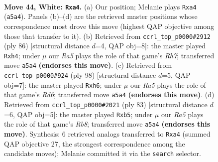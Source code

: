 \documentclass[11pt]{article}
\begin{document}
\clearpage

\begin{figure}[p]\centering
\begin{subfigure}{0.46\textwidth}\centering
\resizebox{\linewidth}{!}{%
\newchessgame
\chessboard[
  setfen={6k1/7r/8/R7/p7/P5K1/8/8 w - - 12 44},
  showmover=false,
  pgfstyle=straightmove, color=movearrow, markmove={a5-a4}
]}
\caption{}
\end{subfigure}\hfill
\begin{subfigure}{0.46\textwidth}\centering
\resizebox{\linewidth}{!}{%
\newchessgame
\chessboard[
  setfen={5r2/7R/8/3k4/7p/8/3K2P1/8 w - - 5 44},
  showmover=false,
  pgfstyle=straightmove, color=movearrow, markmove={h7-h4}
]}
\caption{}
\end{subfigure}
\\[4pt]
\begin{subfigure}{0.46\textwidth}\centering
\resizebox{\linewidth}{!}{%
\newchessgame
\chessboard[
  setfen={8/8/3R3p/5k1P/1K6/8/2r5/8 w - - 0 50},
  showmover=false,
  pgfstyle=straightmove, color=movearrow, markmove={d6-h6}
]}
\caption{}
\end{subfigure}\hfill
\begin{subfigure}{0.46\textwidth}\centering
\resizebox{\linewidth}{!}{%
\newchessgame
\chessboard[
  setfen={6k1/8/7p/1P6/8/3RK3/8/1r6 b - - 4 42},
  showmover=false,
  pgfstyle=straightmove, color=movearrow, markmove={b1-b5}
]}
\caption{}
\end{subfigure}
\caption{\textbf{Move 44, White: \texttt{Rxa4}.} (a) Our position; Melanie plays \texttt{Rxa4} (\texttt{a5a4}). Panels (b)--(d) are the retrieved master positions whose correspondence most drove this move (highest QAP objective among those that transfer to it). (b) Retrieved from \texttt{ccrl\_top\_p0000\#2912} (ply 86) [structural distance $d$=4, QAP obj=8]: the master played \texttt{Rxh4}; under $\mu$ our \emph{Ra5} plays the role of that game's \emph{Rh7}; transferred move \texttt{a5a4} \textbf{(endorses this move)}. (c) Retrieved from \texttt{ccrl\_top\_p0000\#924} (ply 98) [structural distance $d$=5, QAP obj=7]: the master played \texttt{Rxh6}; under $\mu$ our \emph{Ra5} plays the role of that game's \emph{Rd6}; transferred move \texttt{a5a4} \textbf{(endorses this move)}. (d) Retrieved from \texttt{ccrl\_top\_p0000\#2021} (ply 83) [structural distance $d$=6, QAP obj=5]: the master played \texttt{Rxb5}; under $\mu$ our \emph{Ra5} plays the role of that game's \emph{Rb8}; transferred move \texttt{a5a4} \textbf{(endorses this move)}. Synthesis: 6 retrieved analogs transferred to \texttt{Rxa4} (summed QAP objective 27, the strongest correspondence among the candidate moves); Melanie committed it via the \texttt{search} selector.}
\label{fig:thought-m86}
\end{figure}
\end{document}
